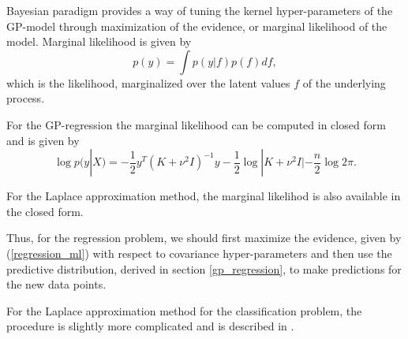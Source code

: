 % 			
% 			

Bayesian paradigm provides a way of tuning the kernel hyper-parameters of the GP-model through maximization of the evidence, or marginal likelihood of the model. Marginal likelihood is given by
$$p(y) = \int p(y | f) p(f) df,$$
which is the likelihood, marginalized over the latent values $f$ of the underlying process.

For the GP-regression the marginal likelihood can be computed in closed form and is given by
\begin{equation}
	\label{regression_ml}
	\log p(y | X) = -\frac 1 2 y^{T} (K + \nu^2 I)^{-1} y - \frac 1 2 \log |K + \nu^2 I| - \frac n 2 \log 2 \pi.
\end{equation}

For the Laplace approximation method, the marginal likelihod is also available in the closed form. 

Thus, for the regression problem, we should first maximize the evidence, given by (\ref{regression_ml}) with respect to covariance hyper-parameters and then use the predictive distribution, derived in section \ref{gp_regression}, to make predictions for the new data points.

For the Laplace approximation method for the classification problem, the procedure is slightly more complicated and is described in \cite{GPinML}.


